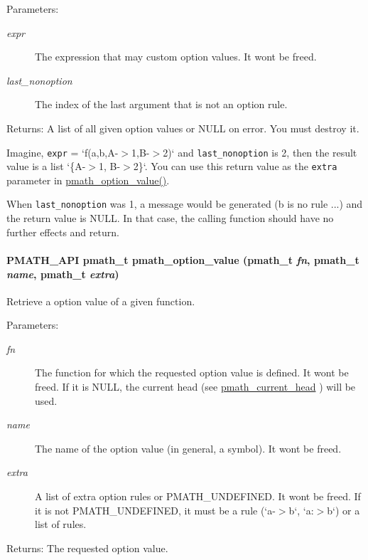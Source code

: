 \begin{Desc}
\item[Parameters:]
\begin{description}
\item[{\em expr}]The expression that may custom option values. It wont be freed. \item[{\em last\_\-nonoption}]The index of the last argument that is not an option rule. \end{description}
\end{Desc}
\begin{Desc}
\item[Returns:]A list of all given option values or NULL on error. You must destroy it.\end{Desc}
Imagine, {\tt expr} = `f(a,b,A-$>$1,B-$>$2)` and {\tt last\_\-nonoption} is 2, then the result value is a list `\{A-$>$1, B-$>$2\}`. You can use this return value as the {\tt extra} parameter in \hyperlink{group__helpers_gc244ab0720278b396976728a39f8bde6}{pmath\_\-option\_\-value()}.

When {\tt last\_\-nonoption} was 1, a message would be generated (b is no rule ...) and the return value is NULL. In that case, the calling function should have no further effects and return. \hypertarget{group__helpers_gc244ab0720278b396976728a39f8bde6}{
\paragraph[{pmath\_\-option\_\-value}]{\setlength{\rightskip}{0pt plus 5cm}PMATH\_\-API {\bf pmath\_\-t} pmath\_\-option\_\-value ({\bf pmath\_\-t} {\em fn}, \/  {\bf pmath\_\-t} {\em name}, \/  {\bf pmath\_\-t} {\em extra})}\hfill}
\label{group__helpers_gc244ab0720278b396976728a39f8bde6}


Retrieve a option value of a given function. 

\begin{Desc}
\item[Parameters:]
\begin{description}
\item[{\em fn}]The function for which the requested option value is defined. It wont be freed. If it is NULL, the current head (see \hyperlink{group__helpers_g70aa270956b6c8f8eb43431f9775ae88}{pmath\_\-current\_\-head} ) will be used. \item[{\em name}]The name of the option value (in general, a symbol). It wont be freed. \item[{\em extra}]A list of extra option rules or PMATH\_\-UNDEFINED. It wont be freed. If it is not PMATH\_\-UNDEFINED, it must be a rule (`a-$>$b`, `a:$>$b`) or a list of rules. \end{description}
\end{Desc}
\begin{Desc}
\item[Returns:]The requested option value. \end{Desc}
